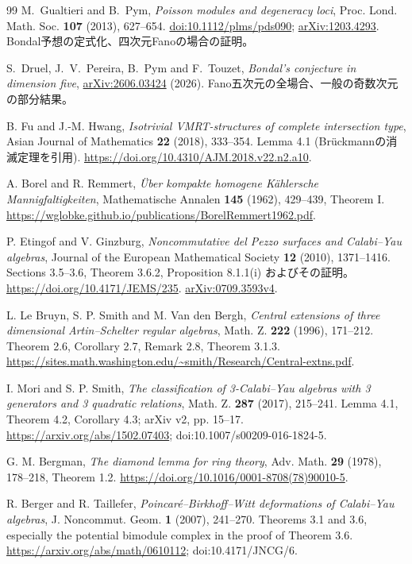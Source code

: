 \begin{thebibliography}{99}
M.~Gualtieri and B.~Pym,
\emph{Poisson modules and degeneracy loci},
Proc. Lond. Math. Soc. \textbf{107} (2013), 627--654.
\href{https://doi.org/10.1112/plms/pds090}{doi:10.1112/plms/pds090};
\href{https://arxiv.org/abs/1203.4293}{arXiv:1203.4293}.
Bondal予想の定式化、四次元Fanoの場合の証明。

S.~Druel, J.~V.~Pereira, B.~Pym and F.~Touzet,
\emph{Bondal's conjecture in dimension five},
\href{https://arxiv.org/abs/2606.03424}{arXiv:2606.03424} (2026).
Fano五次元の全場合、一般の奇数次元の部分結果。

B. Fu and J.-M. Hwang,
\emph{Isotrivial VMRT-structures of complete intersection type},
Asian Journal of Mathematics \textbf{22} (2018), 333--354.
Lemma 4.1 (Br\"uckmannの消滅定理を引用).
\url{https://doi.org/10.4310/AJM.2018.v22.n2.a10}.

A. Borel and R. Remmert,
\emph{\"Uber kompakte homogene K\"ahlersche Mannigfaltigkeiten},
Mathematische Annalen \textbf{145} (1962), 429--439, Theorem I.
\url{https://wglobke.github.io/publications/BorelRemmert1962.pdf}.

P. Etingof and V. Ginzburg,
\emph{Noncommutative del Pezzo surfaces and Calabi--Yau algebras},
Journal of the European Mathematical Society \textbf{12} (2010), 1371--1416.
Sections 3.5--3.6, Theorem 3.6.2, Proposition 8.1.1(i) およびその証明。
\url{https://doi.org/10.4171/JEMS/235}.
\href{https://arxiv.org/abs/0709.3593v4}{arXiv:0709.3593v4}.

 L. Le Bruyn, S. P. Smith and M. Van den Bergh,
\emph{Central extensions of three dimensional Artin--Schelter regular algebras},
Math. Z. \textbf{222} (1996), 171--212.
Theorem 2.6, Corollary 2.7, Remark 2.8, Theorem 3.1.3.
\url{https://sites.math.washington.edu/~smith/Research/Central-extns.pdf}.

 I. Mori and S. P. Smith,
\emph{The classification of 3-Calabi--Yau algebras with 3 generators and 3 quadratic relations},
Math. Z. \textbf{287} (2017), 215--241.
Lemma 4.1, Theorem 4.2, Corollary 4.3; arXiv v2, pp. 15--17.
\url{https://arxiv.org/abs/1502.07403}; doi:10.1007/s00209-016-1824-5.

 G. M. Bergman,
\emph{The diamond lemma for ring theory}, Adv. Math. \textbf{29} (1978), 178--218, Theorem 1.2.
\url{https://doi.org/10.1016/0001-8708(78)90010-5}.

 R. Berger and R. Taillefer,
\emph{Poincar\'e--Birkhoff--Witt deformations of Calabi--Yau algebras},
J. Noncommut. Geom. \textbf{1} (2007), 241--270.
Theorems 3.1 and 3.6, especially the potential bimodule complex in the proof of Theorem 3.6.
\url{https://arxiv.org/abs/math/0610112}; doi:10.4171/JNCG/6.


\end{thebibliography}

